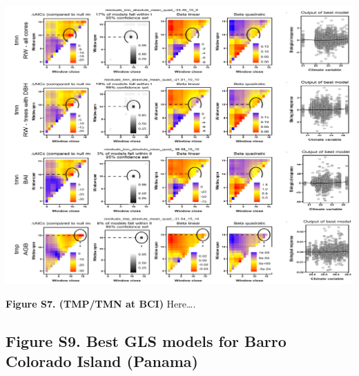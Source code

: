 \documentclass[
]{article}
\begin{document}
\includegraphics{tables_figures/SI_figures/climwin_plots_combined/BCI_tmp_tmn.png}

\textbf{Figure S7. (TMP/TMN at BCI)} Here\ldots.

\newpage

\hypertarget{figure-s9.-best-gls-models-for-barro-colorado-island-panama}{%
\subsection{Figure S9. Best GLS models for Barro Colorado Island
(Panama)}\label{figure-s9.-best-gls-models-for-barro-colorado-island-panama}}
\end{document}
